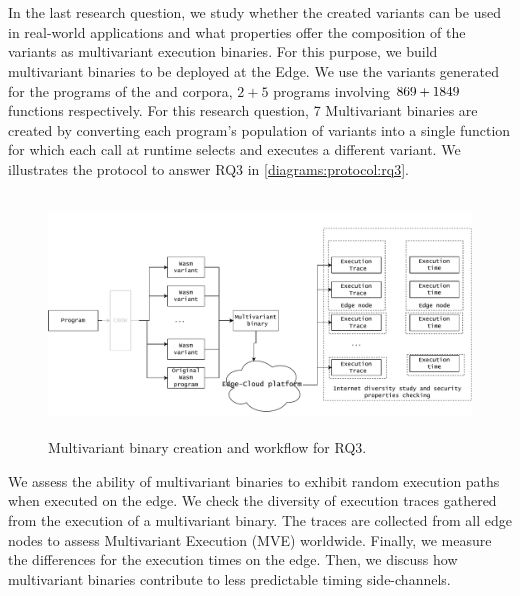 
\section{\rqthree}
\label{rq3:method}

\newcommand{\mewe}{MEWE\xspace}

In the last research question, we study whether the created variants can be used in real-world applications and what properties offer the composition of the variants as multivariant execution binaries. For this purpose, we build multivariant binaries to be deployed at the Edge. We use the variants generated for the programs of the \corpussodium and \corpusqrcode corpora, $2 + 5$ programs involving $ 869 + 1849$ functions respectively. For this research question, 7 Multivariant binaries are created by converting each program's population of variants into a single function for which each call at runtime selects and executes a different variant. We illustrates the protocol to answer RQ3 in \autoref{diagrams:protocol:rq3}.



\begin{figure}[h]
    \centering
    \includegraphics[height=2.50in]{diagrams/Rq3.pdf}
    \caption{Multivariant binary creation and workflow for RQ3.}
    \label{diagrams:protocol:rq3}
\end{figure}

We assess the ability of multivariant binaries to exhibit random execution paths when executed on the edge. We check the diversity of execution traces gathered from the execution of a multivariant binary. The traces are collected from all edge nodes to assess Multivariant Execution (MVE) worldwide. Finally, we measure the differences for the execution times on the edge. Then, we discuss how multivariant binaries contribute to less predictable timing side-channels.

